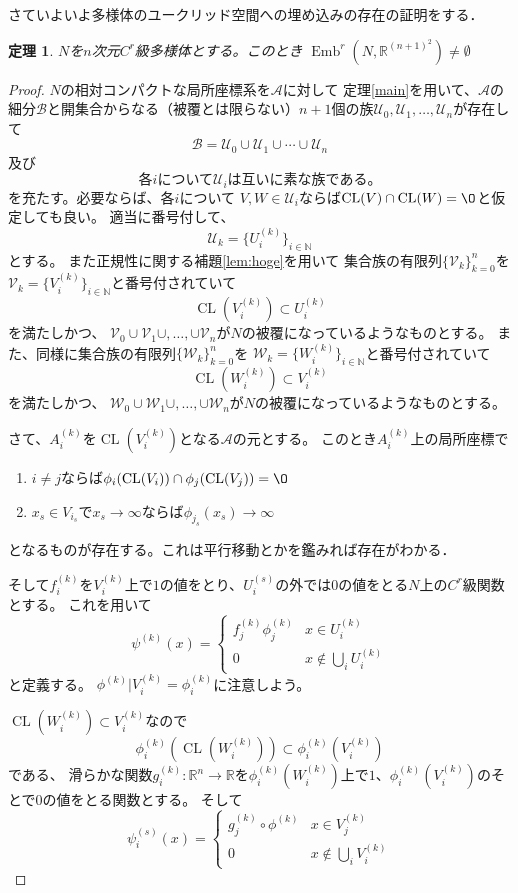 \documentclass[leqno, a4paper, 12pt]{jsarticle}
\newtheorem{thm}{定理}
\newcommand{\nn}{\mathbb{N}}
\newcommand{\rr}{\mathbb{R}}
\DeclareMathOperator{\cl}{CL}
\DeclareMathOperator{\emb}{Emb}
\begin{document}
さていよいよ多様体のユークリッド空間への埋め込みの存在の証明をする．
\begin{thm}
$N$を$n$次元$C^r$級多様体とする。このとき
$\emb^r\left(N, \rr^{(n+1)^2}\right)\neq \emptyset$
\end{thm}
\begin{proof}
$N$の相対コンパクトな局所座標系を$\mathcal{A}$に対して
定理\ref{main}を用いて、$\mathcal{A}$の細分$\mathcal{B}$と開集合からなる（被覆とは限らない）$n+1$個の族$\mathcal{U}_0,\mathcal{U}_1,\dots,\mathcal{U}_n$が存在して
\[
\mathcal{B}=\mathcal{U}_0\cup\mathcal{U}_1\cup\cdots\cup\mathcal{U}_n
\]
及び
\[
\text{各$i$について$\mathcal{U}_i$は互いに素な族である。}
\]
を充たす。必要ならば、各$i$について
$V, W\in \mathcal{U}_i$ならば$\cl(V)\cap \cl(W)=\O$と仮定しても良い。
適当に番号付して、
\[
\mathcal{U}_k=\{U_i^{(k)}\}_{i\in \nn}
\]
とする。
また正規性に関する補題\ref{lem:hoge}を用いて
集合族の有限列$\{\mathcal{V}_k\}_{k=0}^n$を
$\mathcal{V}_k=\{V_i^{(k)}\}_{i\in \nn}$と番号付されていて
\[
\cl(V_i^{(k)})\subset U_i^{(k)}
\]
を満たしかつ、
$\mathcal{V}_0\cup \mathcal{V}_1\cup, \dots, \cup \mathcal{V}_n$が$N$の被覆になっているようなものとする。
また、同様に集合族の有限列$\{\mathcal{W}_k\}_{k=0}^n$を
$\mathcal{W}_k=\{W_i^{(k)}\}_{i\in \nn}$と番号付されていて
\[
\cl(W_i^{(k)})\subset V_i^{(k)}
\]
を満たしかつ、
$\mathcal{W}_0\cup \mathcal{W}_1\cup, \dots, \cup \mathcal{W}_n$が$N$の被覆になっているようなものとする。

さて、$A_i^{(k)}$を$\cl(V_i^{(k)})$となる$\mathcal{A}$の元とする。
このとき$A_i^{(k)}$上の局所座標で
\begin{enumerate}
\item $i\neq j$ならば$\phi_i(\cl(V_i))\cap \phi_j(\cl(V_j))=\O$
\item $x_s\in V_{i_s}$で$x_s\to \infty$ならば$\phi_{j_s}(x_s)\to \infty$
\end{enumerate}
となるものが存在する。これは平行移動とかを鑑みれば存在がわかる．

そして$f_i^{(k)}$を$V_i^{(k)}$上で$1$の値をとり、$U_i^{(s)}$の外では$0$の値をとる$N$上の$C^r$級関数とする。
これを用いて
\[
\psi^{(k)}(x)=
\begin{cases}
f_j^{(k)}\phi_j^{(k)} & \text{$x\in U_i^{(k)}$}\\
0 & \text{$x\not  \in \bigcup_iU_i^{(k)}$}
\end{cases}
\]
と定義する。
$\phi^{(k)}|V_i^{(k)}=\phi_{i}^{(k)}$に注意しよう。

$\cl(W_i^{(k)})\subset V_i^{(k)}$なので
\[
\phi_i^{(k)}(\cl(W_i^{(k)}))\subset \phi_i^{(k)}(V_i^{(k)})
\]
である、
滑らかな関数$g_i^{(k)}:\rr^n\to \rr$を$\phi_i^{(k)}(W_i^{(k)})$上で$1$、$\phi_i^{(k)}(V_i^{(k)})$のそとで$0$の値をとる関数とする。
そして
\[
\psi_i^{(s)}(x)=
\begin{cases}
g_j^{(k)}\circ \phi^{(k)} & \text{$x\in V_j^{(k)}$}\\
0 & \text{$x\not\in \bigcup_{i}V_i^{(k)}$}
\end{cases}
\]


\end{proof}
\end{document}
